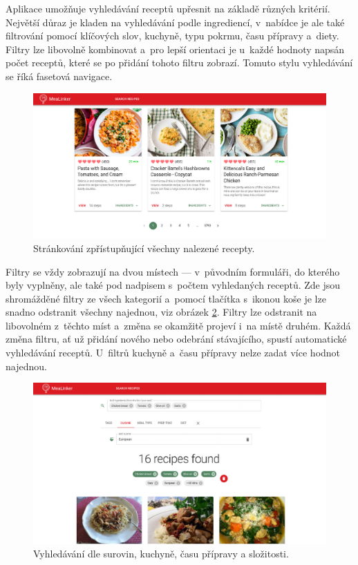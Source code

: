 Aplikace umožňuje vyhledávání receptů upřesnit na základě různých kritérií. Největší důraz je kladen na vyhledávání podle ingrediencí, v~nabídce je ale také filtrování pomocí klíčových slov, kuchyně, typu pokrmu, času přípravy a~diety. Filtry lze libovolně kombinovat a~pro lepší orientaci je u~každé hodnoty napsán počet receptů, které se po přidání tohoto filtru zobrazí. Tomuto stylu vyhledávání se říká fasetová navigace.

\begin{figure}[h!]\centering
\includegraphics[width=140mm]{../img/pagination}
\caption{Stránkování zpřístupňující všechny nalezené recepty.}
\label{obr05:pagination}
\end{figure}

Filtry se vždy zobrazují na dvou místech --- v~původním formuláři, do kterého byly vyplněny, ale také pod nadpisem s~počtem vyhledaných receptů. Zde jsou shromážděné filtry ze všech kategorií a~pomocí tlačítka s~ikonou koše je lze snadno odstranit všechny najednou, viz obrázek \ref{obr05:filter-search}. Filtry lze odstranit na libovolném z~těchto míst a~změna se okamžitě projeví i~na místě druhém. Každá změna filtru, ať už přidání nového nebo odebrání stávajícího, spustí automatické vyhledávání receptů. U~filtrů kuchyně a~času přípravy nelze zadat více hodnot najednou.

\begin{figure}[h!]\centering
\includegraphics[width=140mm]{../img/filter-search}
\caption{Vyhledávání dle surovin, kuchyně, času přípravy a složitosti.}
\label{obr05:filter-search}
\end{figure}

